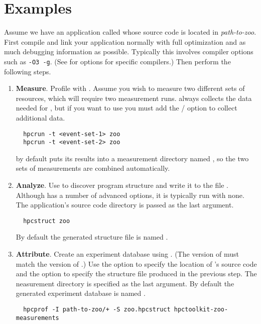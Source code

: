 \documentclass[english]{article}
\begin{document}
\section{Examples}

Assume we have an application called  whose source code is located in \emph{path-to-zoo}.
First compile and link your application normally with full optimization
and as much debugging information as possible.
Typically this involves compiler options such as \verb+-O3 -g+.
(See  for options for specific compilers.)
Then perform the following steps.

\begin{enumerate}

\item \textbf{Measure}.
Profile with .
Assume you wish to measure two different sets of resources,
which will require two measurement runs.
 always collects the data needed for ,
but if you want to use  you must add
the  /  option to collect additional data.
\begin{verbatim}
  hpcrun -t <event-set-1> zoo
  hpcrun -t <event-set-2> zoo
\end{verbatim}

 by default puts its results into a measurement directory
named ,
so the two sets of measurements are combined automatically.

\item \textbf{Analyze}. 
Use  to discover program structure
and write it to the file .
Although  has a number of advanced options, it is typically run with none.
The application's source code directory is passed as the last argument.
\begin{verbatim}
  hpcstruct zoo
\end{verbatim}

By default the generated structure file is named .

\item \textbf{Attribute}.
Create an experiment database using .
(The version of  must match
the version of .)
Use the  option to specify the location of 's source code
and the  option to specify the structure file produced in the previous step.
The neasurement directory is specified as the last argument.
By default the generated experiment database is named .
\begin{verbatim}
  hpcprof -I path-to-zoo/+ -S zoo.hpcstruct hpctoolkit-zoo-measurements
\end{verbatim}


\end{enumerate}
\end{document}

